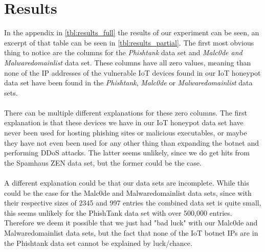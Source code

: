 \documentclass[a4paper,10pt]{article}
\begin{document}

\section{Results} \label{sec:results}

In the appendix in \autoref{tbl:results_full} the results of our experiment can be seen, an excerpt of that table can be seen in 
\autoref{tbl:results_partial}. The first most obvious thing to notice are the
columns for the \textit{Phishtank} data set and \textit{Malc0de and Malwaredomainlist} data set. These columns 
have all zero values, meaning than none of the IP addresses of the vulnerable IoT devices found in our IoT honeypot 
data set have been found in the \textit{Phishtank}, \textit{Malc0de} or \textit{Malwaredomainlist} data sets. 
\\\\
There can be multiple different explanations for these zero columns. The first explanation is that these devices we have
in our IoT honeypot data set have never been used for hosting phishing sites or malicious executables, or maybe they have
not even been used for any other thing than expanding the botnet and performing DDoS attacks. The latter seems unlikely, 
since we do get hits from the Spamhaus ZEN data set, but the former could be the case. 
\\\\
A different explanation could be that our data sets are incomplete. While this could be the case  for the Malc0de and
Malwaredomainlist data sets, since with their respective sizes of 2345 and 997 entries the combined data set is quite small, this seems unlikely for the
PhishTank data set with over 500,000 entries.  Therefore we deem it possible that we just had "bad luck" with our
Malc0de and Malwaredomainlist data sets, but the fact that none of the IoT botnet IPs are in the Phishtank data set 
cannot be explained by luck/chance.
\end{document}
